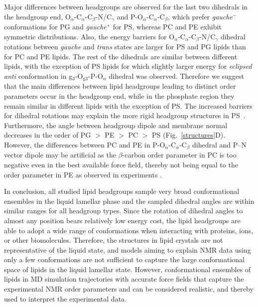 \documentclass[aps,prl,superscriptaddress,twocolumn]{revtex4}
\begin{document}
Major differences between headgroups are observed for the last two dihedrals in the headgroup end,
O$_\alpha$-C$_\alpha$-C$_\beta$-N/C$_\gamma$ and P-O$_\alpha$-C$_\alpha$-C$_\beta$,
which prefer \textit{gauche$^-$} conformations for PG and \textit{gauche$^+$} for PS,
whereas PC and PE exhibit symmetric distributions.
Also, the energy barriers for O$_\alpha$-C$_\alpha$-C$_\beta$-N/C$_\gamma$ dihedral
rotations between \textit{gauche} and \textit{trans} states are larger for
PS and PG lipids than for PC and PE lipids. 
The rest of the dihedrals are similar between different lipids,
with the exception of PS lipids for which slightly larger energy for \textit{eclipsed anti} conformation
in g$_3$-O$_{{\mathrm g}3}$-P-O$_\alpha$ dihedral was observed.
Therefore we suggest that the main differences between lipid headgroups leading to distinct order parameters occur in the headgroup end, while in the phosphate region they remain similar in different lipids with the exception of PS. The increased barriers for dihedral rotations may explain the more rigid headgroup structures in PS~\cite{browning80,buldt81}. Furthermore, the angle between headgroup dipole and membrane normal decreases in the order of PG $>$ PE  $>$ PC  $>$ PS (Fig.~\ref{structures}D). However, the differences between PC and PE in P-O$_\alpha$-C$_\alpha$-C$_\beta$ dihedral
and P--N vector dipole may be artificial as the $\beta$-carbon order parameter in PC is too negative even in the best available force field, thereby not being equal to the order parameter in PE as observed in experiments \cite{botan15}.

In conclusion, all studied lipid headgroups sample very broad conformational ensembles in the liquid lamellar phase and the sampled dihedral angles are within similar ranges for all headgroup types.
Since the rotation of dihedral angles to almost any position bears relatively low energy cost, the lipid headgroups are able to adopt a wide range of conformations when interacting with proteins, ions, or other biomolecules.
Therefore, the structures in lipid crystals \cite{buldt81,pascher92} are not representative of the liquid state, and models aiming to explain NMR data using only a few conformations \cite{seelig77c,davis83,Semchyschyn04,akutsu20} are not sufficient to capture the large conformational space of lipids in the liquid lamellar state.
However, conformational ensembles of lipids in MD simulation trajectories with accurate force fields that capture the experimental NMR order parameters and can be considered realistic, and thereby used to interpret the experimental data.
\end{document}
